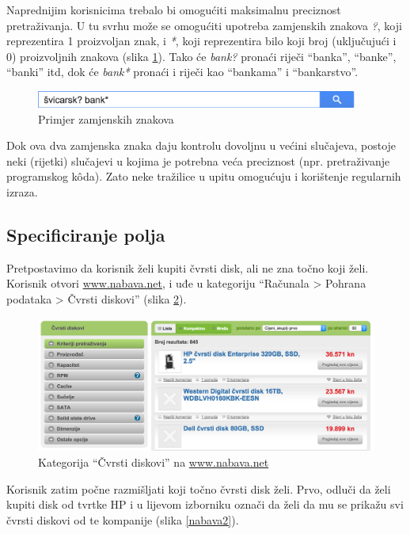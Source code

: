 \documentclass[a4paper,twoside,12pt]{scrreprt}
\begin{document}
Naprednijim korisnicima trebalo bi omogućiti maksimalnu preciznost pretraživanja. U tu svrhu može se omogućiti upotreba zamjenskih znakova \textit{?}, koji reprezentira 1 proizvoljan znak, i \textit{*}, koji reprezentira bilo koji broj (uključujući i 0) proizvoljnih znakova (slika \ref{wildcards}). Tako će \textit{bank?} pronaći riječi ``banka'', ``banke'', ``banki'' itd, dok će \textit{bank*} pronaći i riječi kao ``bankama'' i ``bankarstvo''.

\begin{figure}[H]
  \centering
  \includegraphics[width=300pt]{wildcards}
  \caption{Primjer zamjenskih znakova}
  \label{wildcards}
\end{figure}

Dok ova dva zamjenska znaka daju kontrolu dovoljnu u većini slučajeva, postoje neki (rijetki) slučajevi u kojima je potrebna veća preciznost (npr. pretraživanje programskog kôda). Zato neke tražilice u upitu omogućuju i korištenje regularnih izraza.

\subsection{Specificiranje polja}

Pretpostavimo da korisnik želi kupiti čvrsti disk, ali ne zna točno koji želi. Korisnik otvori \url{www.nabava.net}, i uđe u kategoriju ``Računala > Pohrana podataka > Čvrsti diskovi'' (slika \ref{nabava1}).

\begin{figure}[H]
  \centering
  \includegraphics[width=\textwidth]{nabava1}
  \caption{Kategorija ``Čvrsti diskovi'' na \url{www.nabava.net}}
  \label{nabava1}
\end{figure}

Korisnik zatim počne razmišljati koji točno čvrsti disk želi. Prvo, odluči da želi kupiti disk od tvrtke HP i u lijevom izborniku označi da želi da mu se prikažu svi čvrsti diskovi od te kompanije (slika \ref{nabava2}).
\end{document}
